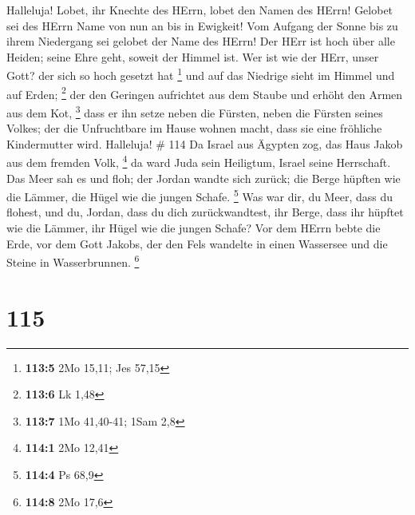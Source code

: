  Halleluja! Lobet, ihr Knechte des HErrn, lobet den Namen
des HErrn!  Gelobet sei des HErrn Name von nun an bis in
Ewigkeit!  Vom Aufgang der Sonne bis zu ihrem Niedergang sei
gelobet der Name des HErrn!  Der HErr ist hoch über alle
Heiden; seine Ehre geht, soweit der Himmel ist.  Wer ist wie
der HErr, unser Gott? der sich so hoch gesetzt hat \footnote{\textbf{113:5}
  2Mo 15,11; Jes 57,15}  und auf das Niedrige sieht im
Himmel und auf Erden; \footnote{\textbf{113:6} Lk 1,48}  der
den Geringen aufrichtet aus dem Staube und erhöht den Armen aus dem Kot,
\footnote{\textbf{113:7} 1Mo 41,40-41; 1Sam 2,8}  dass er
ihn setze neben die Fürsten, neben die Fürsten seines Volkes;
 der die Unfruchtbare im Hause wohnen macht, dass sie eine
fröhliche Kindermutter wird. Halleluja! \# 114  Da Israel
aus Ägypten zog, das Haus Jakob aus dem fremden Volk, \footnote{\textbf{114:1}
  2Mo 12,41}  da ward Juda sein Heiligtum, Israel seine
Herrschaft.  Das Meer sah es und floh; der Jordan wandte
sich zurück;  die Berge hüpften wie die Lämmer, die Hügel
wie die jungen Schafe. \footnote{\textbf{114:4} Ps 68,9} 
Was war dir, du Meer, dass du flohest, und du, Jordan, dass du dich
zurückwandtest,  ihr Berge, dass ihr hüpftet wie die Lämmer,
ihr Hügel wie die jungen Schafe?  Vor dem HErrn bebte die
Erde, vor dem Gott Jakobs,  der den Fels wandelte in einen
Wassersee und die Steine in Wasserbrunnen. \footnote{\textbf{114:8} 2Mo
  17,6}

\hypertarget{section-37}{%
\section{115}\label{section-37}}

